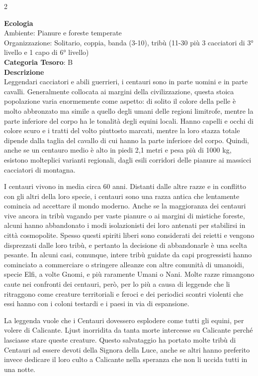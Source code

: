 \begin{multicols}{2}
{\textbf{Ecologia}\\
Ambiente: Pianure e foreste temperate\\
Organizzazione: Solitario, coppia, banda (3-10), tribù (11-30 più 3 cacciatori di 3° livello e 1 capo di 6° livello)\\
\textbf{Categoria Tesoro}: B\\
\textbf{Descrizione}\\
Leggendari cacciatori e abili guerrieri, i centauri sono in parte uomini e in parte cavalli. Generalmente collocata ai margini della civilizzazione, questa stoica popolazione varia enormemente come aspetto: di solito il colore della pelle è molto abbronzato ma simile a quello degli umani delle regioni limitrofe, mentre la parte inferiore del corpo ha le tonalità degli equini locali. Hanno capelli e occhi di colore scuro e i tratti del volto piuttosto marcati, mentre la loro stazza totale dipende dalla taglia del cavallo di cui hanno la parte inferiore del corpo. Quindi, anche se un centauro medio è alto in piedi 2,1 metri e pesa più di 1000 kg, esistono molteplici varianti regionali, dagli esili corridori delle pianure ai massicci cacciatori di montagna.

I centauri vivono in media circa 60 anni. Distanti dalle altre razze e in conflitto con gli altri della loro specie, i centauri sono una razza antica che lentamente comincia ad accettare il mondo moderno. Anche se la maggioranza dei centauri vive ancora in tribù vagando per vaste pianure o ai margini di mistiche foreste, alcuni hanno abbandonato i modi isolazionisti dei loro antenati per stabilirsi in città cosmopolite. Spesso questi spiriti liberi sono considerati dei reietti e vengono disprezzati dalle loro tribù, e pertanto la decisione di abbandonarle è una scelta pesante. In alcuni casi, comunque, intere tribù guidate da capi progressisti hanno cominciato a commerciare o stringere alleanze con altre comunità di umanoidi, specie Elfi, a volte Gnomi, e più raramente Umani o Nani. Molte razze rimangono caute nei confronti dei centauri, però, per lo più a causa di leggende che li ritraggono come creature territoriali e feroci e dei periodici scontri violenti che essi hanno con i coloni testardi e i paesi in via di espansione.

La leggenda vuole che i Centauri dovessero esplodere come tutti gli equini, per volere di Calicante. Ljust inorridita da tanta morte intercesse su Calicante perché lasciasse stare queste creature. Questo salvataggio ha portato molte tribù di Centauri ad essere devoti della Signora della Luce, anche se altri hanno preferito invece dedicare il loro culto a Calicante nella speranza che non li uccida tutti in una notte.

}
\end{multicols}
